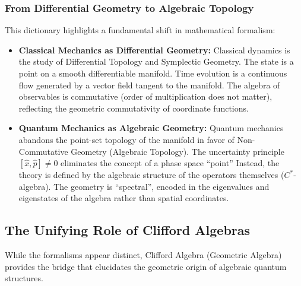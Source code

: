 \subsubsection{From Differential Geometry to Algebraic Topology}

This dictionary highlights a fundamental shift in mathematical formalism:

\begin{itemize}
	\item \textbf{Classical Mechanics as Differential Geometry:}
		Classical dynamics is the study of Differential Topology and
		Symplectic Geometry. The state is a point on a smooth differentiable
		manifold. Time evolution is a continuous flow generated by a vector field
		tangent to the manifold. The algebra of observables is commutative (order of
		multiplication does not matter), reflecting the geometric commutativity of
		coordinate functions.

	\item \textbf{Quantum Mechanics as Algebraic Geometry:}
		Quantum mechanics abandons the point-set topology of the manifold in favor
		of Non-Commutative Geometry (Algebraic Topology). The uncertainty
		principle $[\hat{x}, \hat{p}] \neq 0$ eliminates the concept of a phase
		space ``point'' Instead, the theory is defined by the algebraic structure of
		the operators themselves ($C^*$-algebra). The geometry is ``spectral'',
		encoded in the eigenvalues and eigenstates of the algebra rather than
		spatial coordinates.
\end{itemize}

\subsection{The Unifying Role of Clifford Algebras}

While the formalisms appear distinct, Clifford Algebra (Geometric Algebra)
provides the bridge that elucidates the geometric origin of algebraic quantum
structures.

